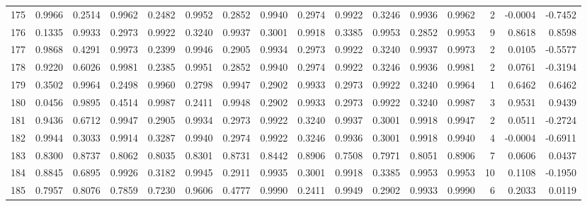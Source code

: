 \begin{tabular}{lrrrrrrrrrrrrrrr}
175 &      0.9966 &  0.2514 &  0.9962 &  0.2482 &  0.9952 &  0.2852 &  0.9940 &  0.2974 &  0.9922 &  0.3246 &   0.9936 &     0.9962 &      2 &                   -0.0004 &                    -0.7452 \\
176 &      0.1335 &  0.9933 &  0.2973 &  0.9922 &  0.3240 &  0.9937 &  0.3001 &  0.9918 &  0.3385 &  0.9953 &   0.2852 &     0.9953 &      9 &                    0.8618 &                     0.8598 \\
177 &      0.9868 &  0.4291 &  0.9973 &  0.2399 &  0.9946 &  0.2905 &  0.9934 &  0.2973 &  0.9922 &  0.3240 &   0.9937 &     0.9973 &      2 &                    0.0105 &                    -0.5577 \\
178 &      0.9220 &  0.6026 &  0.9981 &  0.2385 &  0.9951 &  0.2852 &  0.9940 &  0.2974 &  0.9922 &  0.3246 &   0.9936 &     0.9981 &      2 &                    0.0761 &                    -0.3194 \\
179 &      0.3502 &  0.9964 &  0.2498 &  0.9960 &  0.2798 &  0.9947 &  0.2902 &  0.9933 &  0.2973 &  0.9922 &   0.3240 &     0.9964 &      1 &                    0.6462 &                     0.6462 \\
180 &      0.0456 &  0.9895 &  0.4514 &  0.9987 &  0.2411 &  0.9948 &  0.2902 &  0.9933 &  0.2973 &  0.9922 &   0.3240 &     0.9987 &      3 &                    0.9531 &                     0.9439 \\
181 &      0.9436 &  0.6712 &  0.9947 &  0.2905 &  0.9934 &  0.2973 &  0.9922 &  0.3240 &  0.9937 &  0.3001 &   0.9918 &     0.9947 &      2 &                    0.0511 &                    -0.2724 \\
182 &      0.9944 &  0.3033 &  0.9914 &  0.3287 &  0.9940 &  0.2974 &  0.9922 &  0.3246 &  0.9936 &  0.3001 &   0.9918 &     0.9940 &      4 &                   -0.0004 &                    -0.6911 \\
183 &      0.8300 &  0.8737 &  0.8062 &  0.8035 &  0.8301 &  0.8731 &  0.8442 &  0.8906 &  0.7508 &  0.7971 &   0.8051 &     0.8906 &      7 &                    0.0606 &                     0.0437 \\
184 &      0.8845 &  0.6895 &  0.9926 &  0.3182 &  0.9945 &  0.2911 &  0.9935 &  0.3001 &  0.9918 &  0.3385 &   0.9953 &     0.9953 &     10 &                    0.1108 &                    -0.1950 \\
185 &      0.7957 &  0.8076 &  0.7859 &  0.7230 &  0.9606 &  0.4777 &  0.9990 &  0.2411 &  0.9949 &  0.2902 &   0.9933 &     0.9990 &      6 &                    0.2033 &                     0.0119 \\

\end{tabular}
